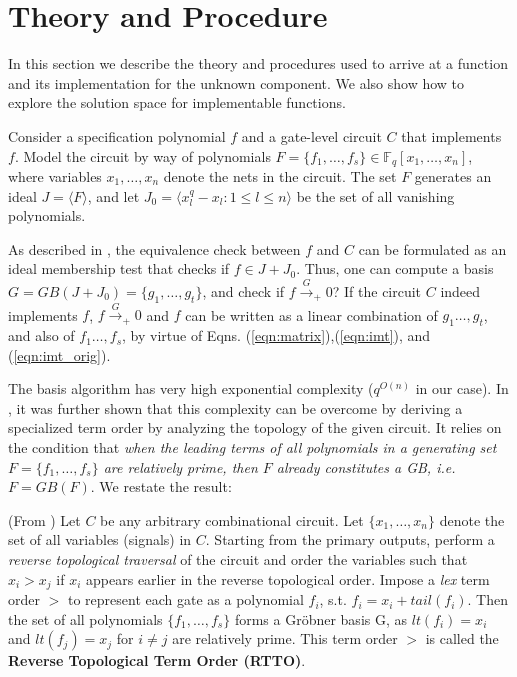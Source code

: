 \section{Theory and Procedure}
\label{sec:theory}
In this section we describe the theory and procedures used to arrive 
at a function and its implementation for the unknown component. We
also show how to explore the solution space for implementable functions. 

Consider a specification polynomial $f$ and a gate-level circuit $C$
that implements $f$. Model the circuit by way of polynomials $F =
\{f_1,\dots,f_s\}\in \mathbb{F}_q[x_1,\dots, x_n]$, where
variables $x_1,\dots,x_n$ denote the nets in the circuit. The set $F$
generates an ideal $J=\langle F \rangle$, and let $J_0=\langle
x_l^q-x_l: 1\leq l\leq n\rangle$ be the set of all vanishing polynomials.

As described in \cite{lv:tcad2013}, the equivalence check between $f$
and $C$ can be formulated as an ideal membership test that checks if
$f \in J + J_0$. Thus, one can compute a \Grobner basis
$G=GB(J+J_0) = \{g_1,\dots,g_t\}$, and check if $f
\xrightarrow{G}_+0$? If the circuit $C$ indeed implements $f$, 
$f \xrightarrow{G}_+ 0$ and $f$ can be written as a linear combination
of $g_1\dots,g_t$, and also of $f_1\dots, f_s$, by virtue of
Eqns. (\ref{eqn:matrix}),(\ref{eqn:imt}), and (\ref{eqn:imt_orig}).

The \Grobner basis algorithm has very high exponential complexity
($q^{O(n)}$ in our case). In \cite{lv:tcad2013}, it was further shown
that this complexity can be overcome by deriving a specialized term
order by analyzing the topology of the given circuit. It relies on the
condition that {\it when the leading terms of all polynomials in a
generating set $F=\{f_1,\dots,f_s\}$ are relatively prime, then $F$
already constitutes a GB, i.e. $F = GB(F)$}. We restate the result:


\begin{Proposition} \label{prop:top-order}
(From \cite{lv:tcad2013}) Let $C$ be any arbitrary combinational
  circuit. Let $\{x_1, \dots, x_n\}$ denote the set of all variables
  (signals) in $C$. Starting from the primary outputs, perform
  a {\it reverse topological traversal} of the circuit and order the
  variables such that $x_i > x_j$ if $x_i$ appears earlier in the
  reverse topological order. Impose a {\it lex} term order $>$ to
  represent each gate as a polynomial $f_i$, s.t. $f_i = x_i +
  tail(f_i)$. Then the set of all polynomials  $\{f_1, \dots, f_s\}$
  forms a Gr\"obner basis G, as $lt(f_i)=x_i$ and $lt(f_j)=x_j$ for 
  $i\neq j$ are relatively prime. This term order $>$ is called the 
  {\bf Reverse Topological Term Order (RTTO)}.
\end{Proposition}


